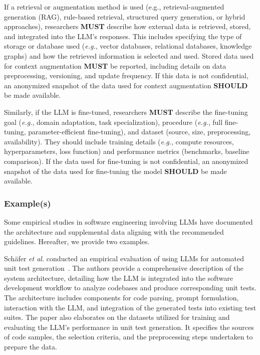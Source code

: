 \documentclass[11pt]{article}
\newcommand{\must}{\textbf{MUST}\xspace}
\newcommand{\should}{\textbf{SHOULD}\xspace}
\begin{document}

If a retrieval or augmentation method is used (e.g., retrieval-augmented generation (RAG), rule-based retrieval, structured query generation, or hybrid approaches), researchers \must describe how external data is retrieved, stored, and integrated into the LLM's responses. This includes specifying the type of storage or database used (\textit{e.g.}, vector databases, relational databases, knowledge graphs) and how the retrieved information is selected and used. Stored data used for context augmentation \must be reported, including details on data preprocessing, versioning, and update frequency. If this data is not confidential, an anonymized snapshot of the data used for context augmentation \should be made available.

Similarly, if the LLM is fine-tuned, researchers \must describe the fine-tuning goal (\textit{e.g.}, domain adaptation, task specialization), procedure (\textit{e.g.}, full fine-tuning, parameter-efficient fine-tuning), and dataset (source, size, preprocessing, availability). They should include training details (\textit{e.g.}, compute resources, hyperparameters, loss function) and performance metrics (benchmarks, baseline comparison). If the data used for fine-tuning is not confidential, an anonymized snapshot of the data used for fine-tuning the model \should be made available.

\subsubsection{Example(s)}

Some empirical studies in software engineering involving LLMs have documented the architecture and supplemental data aligning with the recommended guidelines. Hereafter, we provide two examples.


Sch{\"{a}}fer \textit{et al.} conducted an empirical evaluation of using LLMs for automated unit test generation~\cite{DBLP:journals/tse/SchaferNET24}. The authors provide a comprehensive description of the system architecture, detailing how the LLM is integrated into the software development workflow to analyze codebases and produce corresponding unit tests. The architecture includes components for code parsing, prompt formulation, interaction with the LLM, and integration of the generated tests into existing test suites. The paper also elaborates on the datasets utilized for training and evaluating the LLM's performance in unit test generation. It specifies the sources of code samples, the selection criteria, and the preprocessing steps undertaken to prepare the data.
\end{document}
